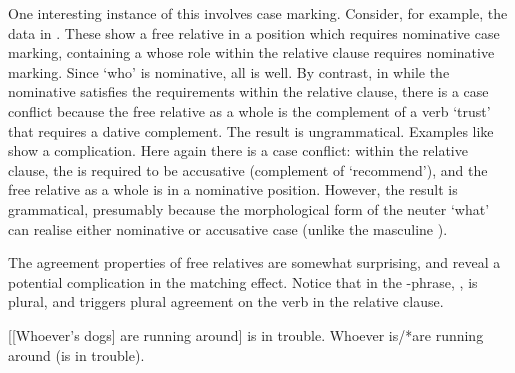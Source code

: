 \documentclass[output=paper,biblatex,babelshorthands,newtxmath,draftmode,colorlinks,citecolor=brown]{langscibook}
\begin{document}
\largerpage[-1]
One interesting instance of this involves case marking. Consider, for example, the  data in
. These show a free relative in a position which requires nominative case
marking, containing a  whose role within the relative clause requires
nominative marking. Since  `who' is nominative, all is well. By contrast, in
 while the nominative  satisfies the requirements within the relative
clause, there is a case conflict because the free relative as a whole is the complement of
a verb  `trust' that requires a dative complement. The result is
ungrammatical. Examples like  show a complication. Here again there is a case
conflict: within the relative clause, the  is required to be accusative
(complement of  `recommend'), and the free relative as a whole is in a
nominative position. However, the result is grammatical, presumably because the
morphological form of the neuter   `what' can realise either
nominative or accusative case (unlike the masculine ).
\begin{exe}\ex\begin{xlist}\label{x:rc-150}
  \label{x:rc-151}
        \label{x:rc-152} 
         \label{x:rc-153}
\end{xlist}\end{exe}  

The agreement properties of free relatives are somewhat surprising, and reveal a potential
complication in the matching effect. Notice that in  the -phrase,
, is plural, and triggers plural agreement on the verb in the relative
clause.
\begin{exe}\ex\label{x:rc-154}
  \begin{xlist}
    \ex\label{x:rc-155} {}[[Whoever's dogs] are running around] is in trouble.
    \ex\label{x:rc-156} Whoever is/*are running around (is in trouble).
  \end{xlist}
\end{exe}
\end{document}

